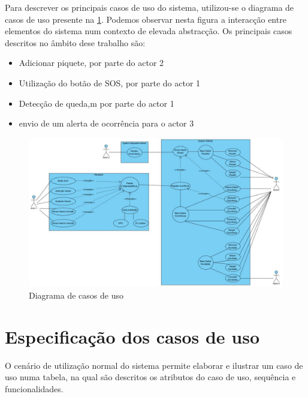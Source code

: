 Para descrever os principais casos de uso do sistema, utilizou-se o diagrama de casos de uso presente na \ref{fig:diagrama_casos_uso}. Podemos observar nesta figura a interacção entre elementos do sistema num contexto de
elevada abstracção. Os principais casos descritos no âmbito dese trabalho são:
\begin{itemize}
	\item Adicionar piquete, por parte do actor 2
	\item Utilização do botão de SOS, por parte do actor 1
	\item Detecção de queda,m por parte do actor 1
	\item envio de um alerta de ocorrência para o actor 3
\end{itemize}

\begin{figure}[!htb]
		\includegraphics[width=\textwidth]{figuras/diagrama_casos_uso.jpg}
		\caption{Diagrama de casos de uso}
		\label{fig:diagrama_casos_uso}
\end{figure}

\section{Especificação dos casos de uso}

O cenário de utilização normal do sistema permite elaborar e ilustrar um caso de uso numa tabela, na qual são descritos os atributos do caso de uso, sequência e funcionalidades.

